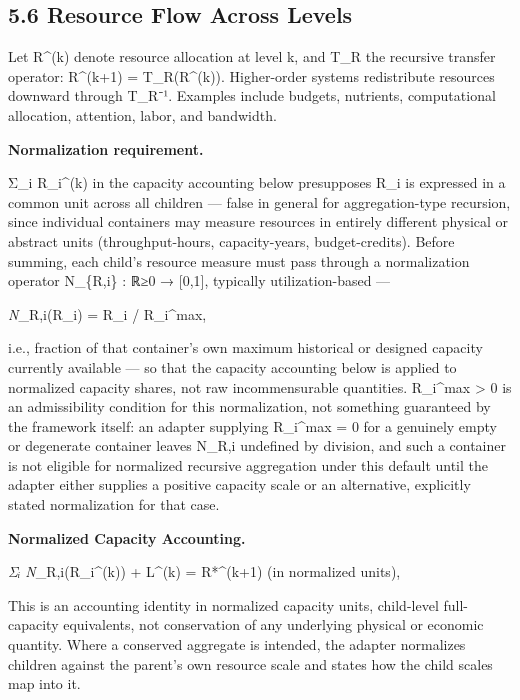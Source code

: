 \documentclass[
]{article}
\begin{document}
\hypertarget{resource-flow-across-levels}{%
\subsection{5.6 Resource Flow Across
Levels}\label{resource-flow-across-levels}}

Let R\^{}(k) denote resource allocation at level k, and T\_R the
recursive transfer operator: R\^{}(k+1) = T\_R(R\^{}(k)). Higher-order
systems redistribute resources downward through T\_R⁻¹. Examples include
budgets, nutrients, computational allocation, attention, labor, and
bandwidth.

\textbf{Normalization requirement.}

Σ\_i R\_i\^{}(k) in the capacity accounting below presupposes R\_i is
expressed in a common unit across all children --- false in general for
aggregation-type recursion, since individual containers may measure
resources in entirely different physical or abstract units
(throughput-hours, capacity-years, budget-credits). Before summing, each
child's resource measure must pass through a normalization operator
N\_\{R,i\} : ℝ≥0 → {[}0,1{]}, typically utilization-based ---

\emph{N}\_R,i(R\_i) = R\_i / R\_i\^{}max,

i.e., fraction of that container's own maximum historical or designed
capacity currently available --- so that the capacity accounting below
is applied to normalized capacity shares, not raw incommensurable
quantities. R\_i\^{}max \textgreater{} 0 is an admissibility condition
for this normalization, not something guaranteed by the framework
itself: an adapter supplying R\_i\^{}max = 0 for a genuinely empty or
degenerate container leaves N\_R,i undefined by division, and such a
container is not eligible for normalized recursive aggregation under
this default until the adapter either supplies a positive capacity scale
or an alternative, explicitly stated normalization for that case.

\textbf{Normalized Capacity Accounting.}

\emph{Σᵢ N}\_R,i(R\_i\^{}(k)) + L\^{}(k) = R*\^{}(k+1) (in normalized
units),

This is an accounting identity in normalized capacity units, child-level
full-capacity equivalents, not conservation of any underlying physical
or economic quantity. Where a conserved aggregate is intended, the
adapter normalizes children against the parent's own resource scale and
states how the child scales map into it.
\end{document}
